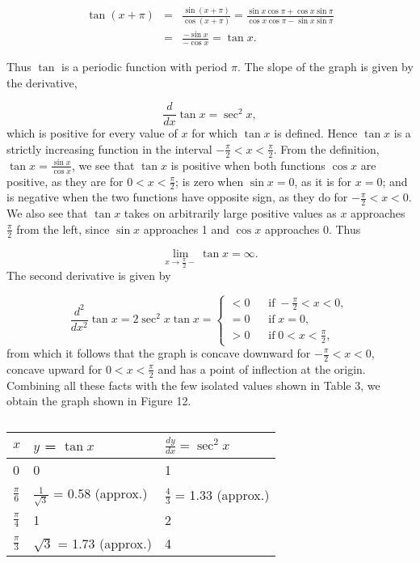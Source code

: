 \begin{eqnarray*}
\tan(x + \pi) &=& \frac{\sin(x + \pi) }{\cos ( x + \pi)} = \frac{\sin x \cos \pi + \cos x \sin \pi}
{\cos x \cos \pi - \sin x \sin \pi} \\
&=& \frac{-\sin x}{-\cos x} = \tan x.
\end{eqnarray*}

\noindent Thus $\tan$ is a periodic function with period $\pi$. The slope of the graph is given by the derivative,

$$
\frac{d}{dx}\tan x = \sec^{2}x,
$$
\noindent which is positive for every value of $x$ for which $\tan x$ is defined. Hence $\tan x$ is a strictly increasing function in the interval $-\frac{\pi}{2} < x < \frac{\pi}{2}$. From the definition, $\tan x = \frac{\sin x}{\cos x}$, we see that $\tan x$ is positive when both functions $\cos x$ are positive, as they are for $0 < x < \frac{\pi}{2}$; is zero when $\sin x = 0$, as it is for $x = 0$; and is negative when the two functions have opposite sign, as they do for $-\frac{\pi}{2} < x < 0$. We also see that $\tan x $ takes on arbitrarily large positive values as $x$ approaches $\frac{\pi}{2}$ from the left, since $\sin x$ approaches 1 and $\cos x$ approaches 0. Thus 

$$
\lim_{x \rightarrow \frac{\pi}{2}-} \tan x = \infty.
$$
\noindent The second derivative is given by 

$$
\frac{d^2}{dx^2} \tan x = 2 \sec^{2} x \tan x = \left\{
\begin{array}{ll}
<0    & \;\;\;\mbox{if}\; - \frac{\pi}{2} < x < 0,\\
 = 0  & \;\;\;\mbox{if}\;  x = 0, \\
 > 0  & \;\;\;\mbox{if}\;   0 < x < \frac{\pi}{2},
\end{array}
 \right .
$$
\noindent from which it follows that the graph is concave downward for $-\frac{\pi}{2} < x < 0$, 
concave upward for $0 < x < \frac{\pi}{2}$ and has a point of inflection at the origin.
Combining all these facts with the few isolated values shown in Table 3, we obtain the graph
shown in Figure 12.

\medskip

\begin{table}
\centering
\begin{tabular}{l|l|l}\hline
$x$ & $y$ = $\tan x$ & $\frac{dy}{dx} = \sec^{2}x$ \\\hline
0 &       0        & 1\\
$\frac{\pi}{6}$ & $\frac{1}{\sqrt 3}$ = 0.58 (approx.) & $\frac{4}{3}$ = 1.33 (approx.)\\
$\frac{\pi}{4}$ & 1 & 2\\
$\frac{\pi}{3}$ & $\sqrt 3$ = 1.73 (approx.) & 4\\ \hline
\end{tabular}
\caption{}
\label{table 6.3}
\end{table}
\medskip

